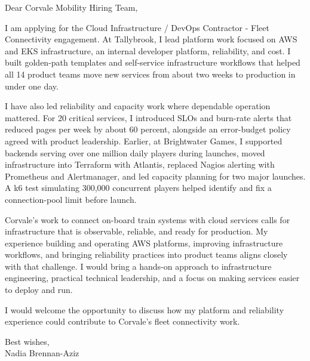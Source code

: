 \documentclass[11pt,a4paper]{article}
\begin{document}
Dear Corvale Mobility Hiring Team,

I am applying for the Cloud Infrastructure / DevOps Contractor - Fleet Connectivity engagement. At Tallybrook, I lead platform work focused on AWS and EKS infrastructure, an internal developer platform, reliability, and cost. I built golden-path templates and self-service infrastructure workflows that helped all 14 product teams move new services from about two weeks to production in under one day.

I have also led reliability and capacity work where dependable operation mattered. For 20 critical services, I introduced SLOs and burn-rate alerts that reduced pages per week by about 60 percent, alongside an error-budget policy agreed with product leadership. Earlier, at Brightwater Games, I supported backends serving over one million daily players during launches, moved infrastructure into Terraform with Atlantis, replaced Nagios alerting with Prometheus and Alertmanager, and led capacity planning for two major launches. A k6 test simulating 300,000 concurrent players helped identify and fix a connection-pool limit before launch.

Corvale's work to connect on-board train systems with cloud services calls for infrastructure that is observable, reliable, and ready for production. My experience building and operating AWS platforms, improving infrastructure workflows, and bringing reliability practices into product teams aligns closely with that challenge. I would bring a hands-on approach to infrastructure engineering, practical technical leadership, and a focus on making services easier to deploy and run.

I would welcome the opportunity to discuss how my platform and reliability experience could contribute to Corvale's fleet connectivity work.

Best wishes,\\
Nadia Brennan-Aziz
\end{document}
